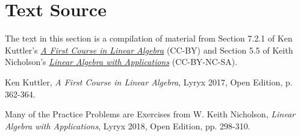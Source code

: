 \documentclass{ximera}
\begin{document}
\section*{Text Source}
The text in this section is a compilation of material from Section 7.2.1 of Ken Kuttler's \href{https://open.umn.edu/opentextbooks/textbooks/a-first-course-in-linear-algebra-2017}{\it A First Course in Linear Algebra} (CC-BY) and Section 5.5 of Keith Nicholson's \href{https://open.umn.edu/opentextbooks/textbooks/linear-algebra-with-applications}{\it Linear Algebra with Applications} (CC-BY-NC-SA).

Ken Kuttler, {\it  A First Course in Linear Algebra}, Lyryx 2017, Open Edition, p. 362-364.

Many of the Practice Problems are Exercises from 
W. Keith Nicholson, {\it Linear Algebra with Applications}, Lyryx 2018, Open Edition, pp. 298-310.
\end{document}
